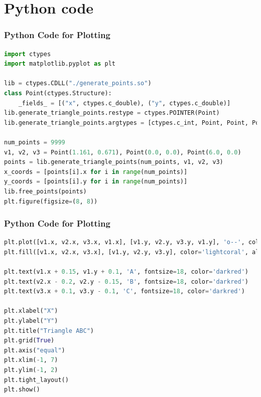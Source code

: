 \documentclass{beamer}
\theoremstyle{remark}
\numberwithin{equation}{section}
\begin{document}
\section{Python code}
\begin{frame}[fragile]
\frametitle{Python Code for Plotting}
\begin{lstlisting}[language=Python]
import ctypes
import matplotlib.pyplot as plt

lib = ctypes.CDLL("./generate_points.so")  
class Point(ctypes.Structure):
    _fields_ = [("x", ctypes.c_double), ("y", ctypes.c_double)]
lib.generate_triangle_points.restype = ctypes.POINTER(Point)
lib.generate_triangle_points.argtypes = [ctypes.c_int, Point, Point, Point]

num_points = 9999
v1, v2, v3 = Point(1.161, 0.671), Point(0.0, 0.0), Point(6.0, 0.0)
points = lib.generate_triangle_points(num_points, v1, v2, v3)
x_coords = [points[i].x for i in range(num_points)]
y_coords = [points[i].y for i in range(num_points)]
lib.free_points(points)
plt.figure(figsize=(8, 8))
\end{lstlisting}
\end{frame}
\begin{frame}[fragile]
\frametitle{Python Code for Plotting}
\begin{lstlisting}[language=Python]
plt.plot([v1.x, v2.x, v3.x, v1.x], [v1.y, v2.y, v3.y, v1.y], 'o--', color='darkblue', linewidth=2)
plt.fill([v1.x, v2.x, v3.x], [v1.y, v2.y, v3.y], color='lightcoral', alpha=0.3)

plt.text(v1.x + 0.15, v1.y + 0.1, 'A', fontsize=18, color='darkred')
plt.text(v2.x - 0.2, v2.y - 0.15, 'B', fontsize=18, color='darkred')
plt.text(v3.x + 0.1, v3.y - 0.1, 'C', fontsize=18, color='darkred')

plt.xlabel("X")
plt.ylabel("Y")
plt.title("Triangle ABC")
plt.grid(True)
plt.axis("equal")
plt.xlim(-1, 7)
plt.ylim(-1, 2)
plt.tight_layout()
plt.show()
\end{lstlisting}
\end{frame}
\end{document}

